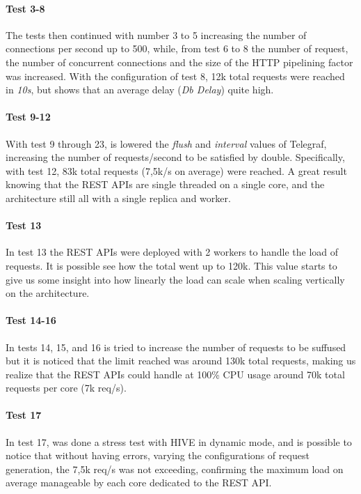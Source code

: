 \documentclass[]{IEEEtran}
\begin{document}
\paragraph{Test 3-8}The tests then continued with number 3 to 5 increasing the number of connections per second up to 500, while, from test 6 to 8 the number of request, the number of concurrent connections and the size of the HTTP pipelining factor was increased. With the configuration of test 8, 12k total requests were reached in \textit{10s}, but shows that an average delay (\textit{Db Delay}) quite high. 
\paragraph{Test 9-12}With test 9 through 23, is lowered the \textit{flush} and \textit{interval} values of Telegraf, increasing the number of requests/second to be satisfied by double. Specifically, with test 12, 83k total requests (7,5k/s on average) were reached. A great result knowing that the REST APIs are single threaded on a single core, and the architecture still all with a single replica and worker.
\paragraph{Test 13}
In test 13 the REST APIs were deployed with 2 workers to handle the load of requests. It is possible see how the total went up to 120k. This value starts to give us some insight into how linearly the load can scale when scaling vertically on the architecture.

\paragraph{Test 14-16}
In tests 14, 15, and 16 is tried to increase the number of requests to be suffused but it is noticed that the limit reached was around 130k total requests, making us realize that the REST APIs could handle at 100\% CPU usage around 70k total requests per core (7k req/s).

\paragraph{Test 17}
In test 17, was done a stress test with HIVE in dynamic mode, and is possible to notice that without having errors, varying the configurations of request generation, the 7,5k req/s was not exceeding, confirming the maximum load on average manageable by each core dedicated to the REST API.
\end{document}
